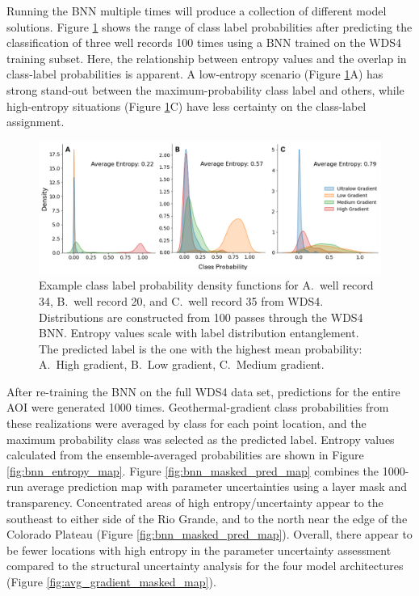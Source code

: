 Running the BNN multiple times will produce a collection of different model solutions. Figure \ref{fig:bnn_class_pdfs} shows the range of class label probabilities after predicting the classification of three well records 100 times using a BNN trained on the WDS4 training subset. Here, the relationship between entropy values and the overlap in class-label probabilities is apparent. A low-entropy scenario (Figure \ref{fig:bnn_class_pdfs}A) has strong stand-out between the maximum-probability class label and others, while high-entropy situations (Figure \ref{fig:bnn_class_pdfs}C) have less certainty on the class-label assignment.

\begin{figure}
\centering
\includegraphics[width=\textwidth]{templates/images/Figure-BNN_100trials_WDS4.png}
\caption[Bayesian neural network class PDFs]{Example class label probability density functions for A.\ well record 34, B.\ well record 20, and C.\ well record 35 from WDS4. Distributions are constructed from 100 passes through the WDS4 BNN. Entropy values scale with label distribution entanglement. The predicted label is the one with the highest mean probability: A.\ High gradient, B.\ Low gradient, C.\ Medium gradient.}
\label{fig:bnn_class_pdfs}
\end{figure}

After re-training the BNN on the full WDS4 data set, predictions for the entire AOI were generated 1000 times. Geothermal-gradient class probabilities from these realizations were averaged by class for each point location, and the maximum probability class was selected as the predicted label. Entropy values calculated from the ensemble-averaged probabilities are shown in Figure \ref{fig:bnn_entropy_map}. Figure \ref{fig:bnn_masked_pred_map} combines the 1000-run average prediction map with parameter uncertainties using a layer mask and transparency. Concentrated areas of high entropy/uncertainty appear to the southeast to either side of the Rio Grande, and to the north near the edge of the Colorado Plateau (Figure \ref{fig:bnn_masked_pred_map}). Overall, there appear to be fewer locations with high entropy in the parameter uncertainty assessment compared to the structural uncertainty analysis for the four model architectures (Figure \ref{fig:avg_gradient_masked_map}).

